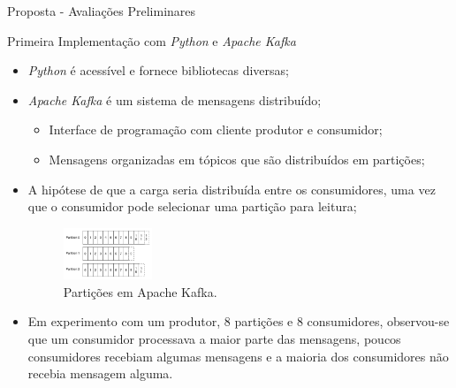 \documentclass[aspectratio=1610,10pt]{beamer}
\newcommand{\fonte}[1]{\vspace{-1em}{\footnotesize\textbf{Fonte:} #1}}
\begin{document}
\begin{frame}[fragile]{Proposta - Avaliações Preliminares}
  \begin{block}{Primeira Implementação com \emph{Python} e \emph{Apache Kafka}}
    \begin{itemize}%
      \item \emph{Python} é acessível e fornece bibliotecas diversas;
      \item \emph{Apache Kafka} é um sistema de mensagens distribuído;
      \begin{itemize}
        \item Interface de programação com cliente produtor e consumidor;
        \item Mensagens organizadas em tópicos que são distribuídos em partições;
      \end{itemize}
      \item A hipótese de que a carga seria distribuída entre os consumidores,
      uma vez que o consumidor pode selecionar uma partição para leitura;
      \begin{figure}\small
        \includegraphics[width=0.25\textwidth]{figuras/kafka-partitions-Kreps2014.png}
        \caption{Partições em Apache Kafka.}
        \fonte{\citeonline{Kreps2014}.}
      \end{figure}
      \item Em experimento com um produtor, 8 partições e 8 consumidores,
      observou-se que um consumidor processava a maior parte das mensagens,
      poucos consumidores recebiam algumas mensagens e a maioria dos consumidores
      não recebia mensagem alguma.
    \end{itemize}
  \end{block}

\end{frame}
\end{document}

